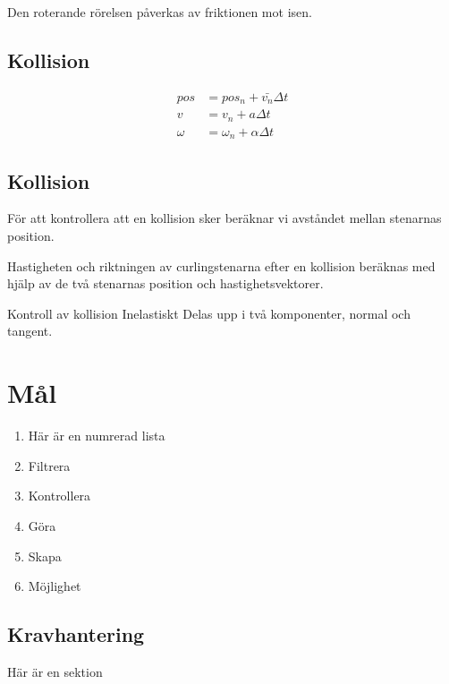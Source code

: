 \documentclass[11pt]{article} %
\begin{document}
 Den roterande rörelsen påverkas av friktionen mot isen. 

\subsection{Kollision}


 \begin{align} %
 pos&=pos_n+\bar{v_n}\Delta t \\  %
 v&=v_n+a \Delta t \\ 
 \omega&=\omega_n+\alpha \Delta t  
 \end{align}

\subsection{Kollision}

För att kontrollera att en kollision sker beräknar vi avståndet mellan stenarnas position.

Hastigheten och riktningen av curlingstenarna efter en kollision beräknas med hjälp av de två stenarnas position och hastighetsvektorer. 

Kontroll av kollision
Inelastiskt
Delas upp i två komponenter, normal och tangent.




\section{Mål}



\begin{enumerate}
\item Här är en numrerad lista
\item Filtrera 
\item Kontrollera 
\item Göra 
\item Skapa 
\item Möjlighet 
\end{enumerate}


\pagebreak 



\subsection{Kravhantering}

Här är en sektion
\end{document}

